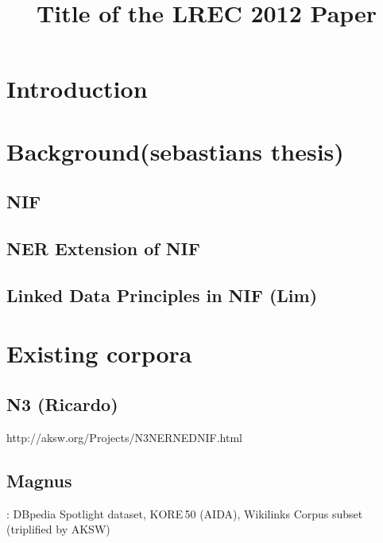 \documentclass[10pt, a4paper]{article}
\title{Title of the LREC 2012 Paper}
\begin{document}
\maketitleabstract


\section{Introduction}


\section{Background(sebastians thesis)}
\subsection{NIF}
\subsection{NER Extension of NIF}
\subsection{Linked Data Principles in NIF (Lim)}



\section{Existing corpora}

\subsection{N3 (Ricardo)}
http://aksw.org/Projects/N3NERNEDNIF.html\\
\subsection{Magnus}
\cite{steinmetz-n-2013-statistical}: DBpedia Spotlight dataset, KORE\,50 (AIDA), Wikilinks Corpus \cite{singh-s-2012-wikilinks} subset (triplified by AKSW)\\
\end{document}
